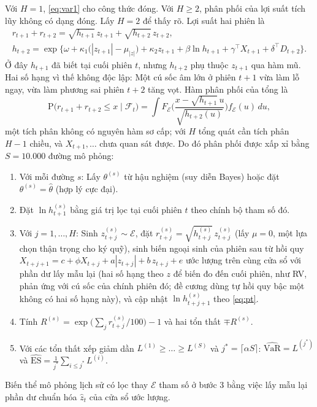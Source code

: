 \documentclass[12pt,a4paper]{article}
\theoremstyle{definition}
\theoremstyle{remark}
\newcommand{\Prob}{\mathrm{P}}
\newcommand{\VaR}{\mathrm{VaR}}
\newcommand{\ES}{\mathrm{ES}}
\newcommand{\Fcal}{\mathcal{F}}
\newcommand{\Ecal}{\mathcal{E}}
\begin{document}
Với $H=1$, \eqref{eq:var1} cho công thức đóng. Với $H\ge2$, phân phối của lợi suất tích lũy không có dạng đóng. Lấy $H=2$ để thấy rõ. Lợi suất hai phiên là
\begin{gather*}
r_{t+1}+r_{t+2}=\sqrt{h_{t+1}}\,z_{t+1}+\sqrt{h_{t+2}}\,z_{t+2},\\
h_{t+2}=\exp\Big\{\omega+\kappa_1\big(|z_{t+1}|-\mu_{|z|}\big)+\kappa_2 z_{t+1}+\beta\ln h_{t+1}+\gamma^\top X_{t+1}+\delta^\top D_{t+2}\Big\}.
\end{gather*}
Ở đây $h_{t+1}$ đã biết tại cuối phiên $t$, nhưng $h_{t+2}$ phụ thuộc $z_{t+1}$ qua hàm mũ. Hai số hạng vì thế không độc lập: Một cú sốc âm lớn ở phiên $t+1$ vừa làm lỗ ngay, vừa làm phương sai phiên $t+2$ tăng vọt. Hàm phân phối của tổng là
\begin{equation*}
\Prob\big(r_{t+1}+r_{t+2}\le x\mid\Fcal_t\big)=\int F_\Ecal\Big(\frac{x-\sqrt{h_{t+1}}\,u}{\sqrt{h_{t+2}(u)}}\Big)f_\Ecal(u)\,du ,
\end{equation*}
một tích phân không có nguyên hàm sơ cấp; với $H$ tổng quát cần tích phân $H-1$ chiều, và $X_{t+1},\dots$ chưa quan sát được. Do đó phân phối được xấp xỉ bằng $S=10.000$ đường mô phỏng:
\begin{enumerate}
\item Với mỗi đường $s$: Lấy $\theta^{(s)}$ từ hậu nghiệm (suy diễn Bayes) hoặc đặt $\theta^{(s)}=\hat\theta$ (hợp lý cực đại).
\item Đặt $\ln h^{(s)}_{t+1}$ bằng giá trị lọc tại cuối phiên $t$ theo chính bộ tham số đó.
\item Với $j=1,\dots,H$: Sinh $z^{(s)}_{t+j}\sim\Ecal$, đặt $r^{(s)}_{t+j}=\sqrt{h^{(s)}_{t+j}}\,z^{(s)}_{t+j}$ (lấy $\mu=0$, một lựa chọn thận trọng cho ký quỹ), sinh biến ngoại sinh của phiên sau từ hồi quy $X_{t+j+1}=c+\phi X_{t+j}+a|z_{t+j}|+b\,z_{t+j}+e$ ước lượng trên cùng cửa sổ với phần dư lấy mẫu lại (hai số hạng theo $z$ để biến đo đến cuối phiên, như RV, phản ứng với cú sốc của chính phiên đó; đề cương dùng tự hồi quy bậc một không có hai số hạng này), và cập nhật $\ln h^{(s)}_{t+j+1}$ theo \eqref{eq:pt}.
\item Tính $R^{(s)}=\exp\big(\sum_{j}r^{(s)}_{t+j}/100\big)-1$ và hai tổn thất $\mp R^{(s)}$.
\item Với các tổn thất xếp giảm dần $L^{(1)}\ge\dots\ge L^{(S)}$ và $j^{*}=\lceil\alpha S\rceil$: $\widehat{\VaR}=L^{(j^{*})}$ và $\widehat{\ES}=\frac1{j^{*}}\sum_{i\le j^{*}}L^{(i)}$.
\end{enumerate}
Biến thể mô phỏng lịch sử có lọc \cite{mcneilfrey2000} thay $\Ecal$ tham số ở bước 3 bằng việc lấy mẫu lại phần dư chuẩn hóa $\hat z_t$ của cửa sổ ước lượng.
\end{document}
